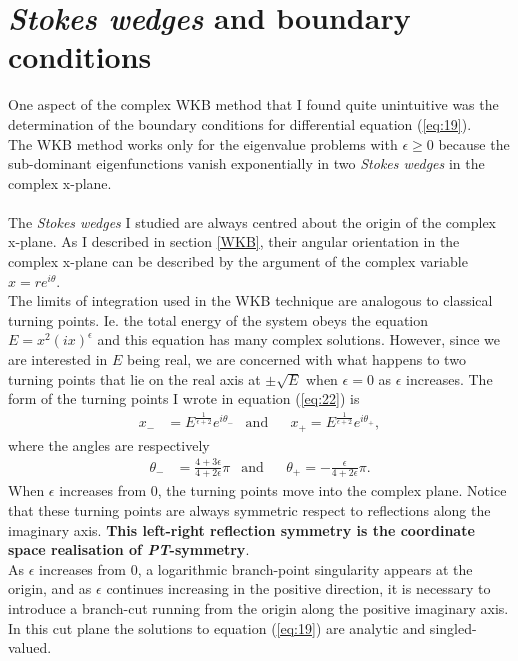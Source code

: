 \documentclass[10pt, a4paper, singlespacing]{report}
\newcommand\PT{\emph{PT}}
\begin{document}
\section{\emph{Stokes wedges} and boundary conditions} \label{Boundary conditions}

One aspect of the complex WKB method that I found quite unintuitive was the determination of the boundary conditions for differential equation (\ref{eq:19}).\\
The WKB method works only for the eigenvalue problems with $\epsilon \geq 0$ because the sub-dominant eigenfunctions vanish exponentially in two \emph{Stokes wedges} in the complex x-plane\cite{BenderPT}.\\\\
The \emph{Stokes wedges} I studied are always centred about the origin of the complex x-plane. As I described in section \ref{WKB}, their angular orientation in the complex x-plane can be described by the argument of the complex variable $x = re^{i\theta}$.\\
The limits of integration used in the WKB technique are analogous to classical turning points. Ie. the total energy of the system obeys the equation $E = x^2 (ix)^{\epsilon}$ and this equation has many complex solutions. However, since we are interested in $E$ being real, we are concerned with what happens to two turning points that lie on the real axis at $\pm \sqrt{E}$ when $\epsilon = 0$ as $\epsilon$ increases\cite{BenderPT}.
The form of the turning points I wrote in equation (\ref{eq:22}) is 
\begin{align} \label{eq:32}
x_{-}& = 
E^{\frac{1}{\epsilon + 2}}
e^{i\theta_{-}}
&\mathrm{and}&
&x_{+} = E^{\frac{1}{\epsilon + 2}} e^{i\theta_{+}},
\end{align}
where the angles are respectively
\begin{align} \label{eq:33}
\theta_{-}& = \frac{4 + 3\epsilon}{4 + 2 \epsilon} \pi
&\mathrm{and}&
&\theta_{+} = - \frac{\epsilon}{4 + 2 \epsilon} \pi.
\end{align}
When $\epsilon$ increases from 0, the turning points move into the complex plane. Notice that these turning points are always symmetric respect to reflections along the imaginary axis. \textbf{This left-right reflection symmetry is the coordinate space realisation of \PT-symmetry}\cite{BenderPT}.\\
As $\epsilon$ increases from 0, a logarithmic branch-point singularity appears at the origin, and as $\epsilon$ continues increasing in the positive direction, it is necessary to introduce a branch-cut running from the origin along the positive imaginary axis. In this cut plane the solutions to equation (\ref{eq:19}) are analytic and singled-valued\cite{BenderPT}.\\
\end{document}
